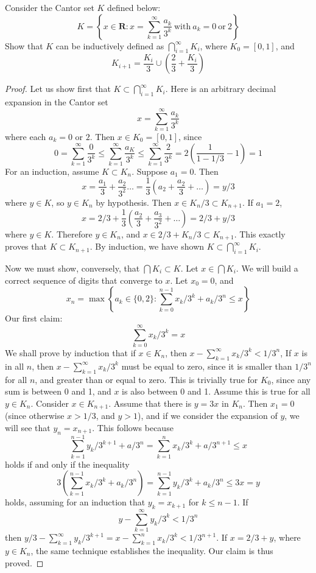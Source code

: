 \begin{exercise}
    Consider the Cantor set $K$ defined below:
    \[ K = \left\{ x \in \mathbf{R} : x = \sum_{k = 1}^\infty \frac{a_k}{3^k} \ \text{with}\ a_k = 0\ \text{or}\ 2 \right\} \]
    Show that $K$ can be inductively defined as $\bigcap_{i = 1}^\infty K_i$, where $K_0 = [0,1]$, and
    \[ K_{i+1} = \frac{K_i}{3} \cup \left(\frac{2}{3} + \frac{K_i}{3}\right) \]
\end{exercise}
\begin{proof}
    Let us show first that $K \subset \bigcap_{i = 1}^\infty K_i$. Here is an arbitrary decimal expansion in the Cantor set
    \[ x = \sum_{k = 1}^\infty \frac{a_k}{3^k} \]
    where each $a_k = 0$ or $2$. Then $x \in K_0 = [0,1]$, since
    \[ 0 = \sum_{k = 1}^\infty \frac{0}{3^k} \leq \sum_{k = 1}^\infty \frac{a_K}{3^k} \leq \sum_{k = 1}^\infty \frac{2}{3^k} = 2(\frac{1}{1 - 1/3} - 1) = 1 \]
    For an induction, assume $K \subset K_n$. Suppose $a_1 = 0$. Then
    \[ x = \frac{a_1}{3} + \frac{a_2}{3^2} \dots = \frac{1}{3} (a_2 + \frac{a_2}{3} + \dots) = y/3 \]
    where $y \in K$, so $y \in K_n$ by hypothesis. Then $x \in K_n/3 \subset K_{n+1}$. If $a_1 = 2$,
    \[ x = 2/3 + \frac{1}{3}(\frac{a_2}{3} + \frac{a_3}{3^2} + \dots) = 2/3 + y/3 \]
    where $y \in K$. Therefore $y \in K_n$, and $x \in 2/3 + K_n/3 \subset K_{n+1}$. This exactly proves that $K \subset K_{n + 1}$. By induction, we have shown $K \subset \bigcap_{i = 1}^\infty K_i$.

    Now we must show, conversely, that $\bigcap K_i \subset K$. Let $x \in \bigcap K_i$. We will build a correct sequence of digits that converge to $x$. Let $x_0 = 0$, and
    \[ x_n = \max \left\{ a_k \in \{0,2\} : \sum_{k = 0}^{n-1} x_k/3^k + a_k/3^n \leq x \right\} \]
    Our first claim:
    \[ \sum_{k = 0}^\infty x_k/3^k = x \]
    We shall prove by induction that if $x \in K_n$, then $x - \sum_{k = 1}^\infty x_k/3^k < 1/3^n$, If $x$ is in all $n$, then $x - \sum_{k = 1}^\infty x_k/3^k$ must be equal to zero, since it is smaller than $1/3^n$ for all $n$, and greater than or equal to zero. This is trivially true for $K_0$, since any sum is between 0 and 1, and $x$ is also between 0 and 1. Assume this is true for all $y \in K_n$. Consider $x \in K_{n+1}$. Assume that there is $y = 3x$ in $K_n$. Then $x_1 = 0$ (since otherwise $x > 1/3$, and $y > 1$), and if we consider the expansion of $y$, we will see that $y_n = x_{n+1}$. This follows because
    \[ \sum_{k = 1}^{n-1} y_k/3^{k+1} + a/3^n = \sum_{k = 1}^{n} x_k/3^k + a/3^{n+1} \leq x \]
    holds if and only if the inequality
    \[ 3\left(\sum_{k = 1}^{n-1} x_k/3^k + a_k/3^n\right) = \sum_{k = 1}^{n-1} y_k/3^k + a_k/3^n \leq 3x = y \]
    holds, assuming for an induction that $y_k = x_{k+1}$ for $k \leq n-1$. If
    \[ y - \sum_{k = 1}^\infty y_k/3^k < 1/3^n \]
    then $y/3 - \sum_{k = 1}^\infty y_k/3^{k+1} = x - \sum_{k = 1}^n x_k/3^k < 1/3^{n+1}$. If $x = 2/3 + y$, where $y \in K_n$, the same technique establishes the inequality. Our claim is thus proved.
\end{proof}

